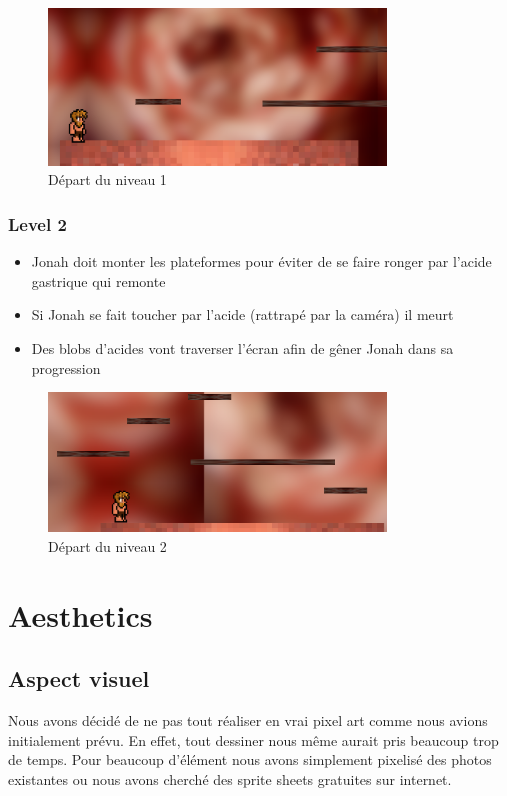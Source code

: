 \documentclass{prologArticle}
\begin{document}
\begin{figure}[H]
    \centering
    \includegraphics[width=0.8\textwidth]{res/level1.png}
    \caption{Départ du niveau 1}
\end{figure}

\subsubsection{Level 2}

\begin{itemize}
    \item Jonah doit monter les plateformes pour éviter de se faire ronger par l'acide gastrique qui remonte
    \item Si Jonah se fait toucher par l'acide (rattrapé par la caméra) il meurt
    \item Des blobs d'acides vont traverser l'écran afin de gêner Jonah dans sa progression
\end{itemize}

\begin{figure}[H]
    \centering
    \includegraphics[width=0.8\textwidth]{res/level2.png}
    \caption{Départ du niveau 2}
\end{figure}


\section{Aesthetics}

\subsection{Aspect visuel}
Nous avons décidé de ne pas tout réaliser en vrai pixel art comme nous avions initialement prévu. En effet, tout dessiner nous même aurait pris beaucoup trop de temps. Pour beaucoup d'élément nous avons simplement pixelisé des photos existantes ou nous avons cherché des sprite sheets gratuites sur internet.
\end{document}
